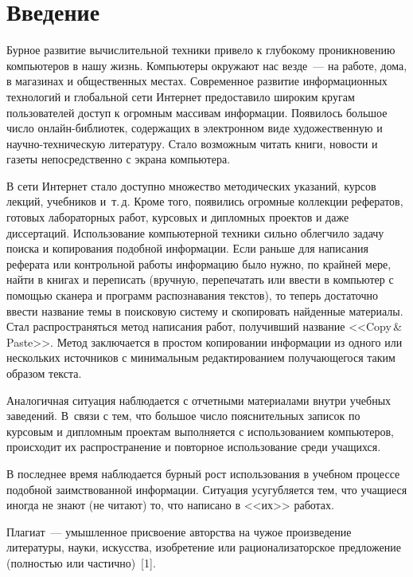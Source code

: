       \begin{multicols}{2}

            \label{st\stat}


\section{Введение}
  
  Бурное развитие вычислительной техники привело к глубокому 
проникновению компьютеров в нашу жизнь. Компьютеры окружают нас 
везде~--- на работе, дома, в магазинах и общественных мес\-тах. Современное 
развитие информационных технологий и глобальной сети Интернет 
предоставило широким кругам пользователей доступ к огромным массивам 
информации. Появилось большое чис\-ло он\-лайн-биб\-лио\-тек, содержащих в 
электронном виде художественную и научно-техническую литературу. Стало 
возможным читать книги, новости и газеты непосредственно с экрана 
компьютера. 
  
  В сети Интернет стало доступно множество методических указаний, курсов 
лекций, учебников и~т.\,д. Кроме того, появились огромные коллекции 
рефератов, готовых лабораторных работ, курсовых и дипломных проектов и 
даже диссертаций. Использование компьютерной техники сильно облегчило 
задачу поиска и копирования подобной информации. Если раньше для 
написания реферата или контрольной работы информацию было нужно, по 
крайней мере, найти в книгах и переписать (вручную, перепечатать или ввести 
в компьютер с помощью сканера и программ распознавания текстов), то теперь 
достаточно ввести название темы в поисковую сис\-те\-му и скопировать 
найденные материалы. Стал распространяться метод написания работ, 
получивший название <<{Copy}\,\&\,{Paste}>>. Метод заключается в 
простом копировании информации из одного или нескольких источников с 
минимальным редактированием получающегося таким образом текста. 
  
  Аналогичная ситуация наблюдается с отчетными материалами внутри 
учебных заведений. В~связи с тем, что большое число пояснительных записок 
по курсовым и дипломным проектам выполняется с использованием 
компьютеров, происходит их распространение и повторное использование 
среди учащихся.
  
  В последнее время наблюдается бурный рост использования в учебном 
процессе подобной заимствованной информации. Ситуация усугубляется тем, 
что учащиеся иногда не знают (не читают) то, что написано в <<их>> работах. 
  
  Плагиат~--- умышленное присвоение авторства на чужое произведение 
литературы, науки, искусства, изобретение или рационализаторское 
предложение (полностью или частично)~[1].
  

\end{multicols}
